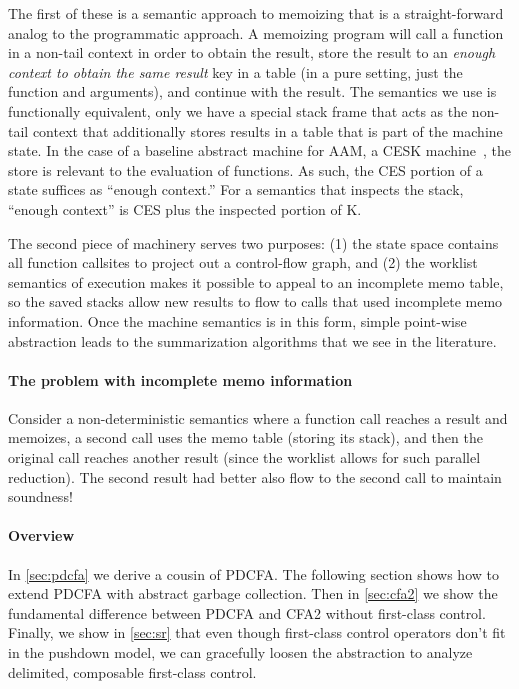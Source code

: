 The first of these is a semantic approach to memoizing that is a straight-forward analog to the programmatic approach.
%
A memoizing program will call a function in a non-tail context in order to obtain the result, store the result to an \emph{enough context to obtain the same result} key in a table (in a pure setting, just the function and arguments), and continue with the result.
%
The semantics we use is functionally equivalent, only we have a special stack frame that acts as the non-tail context that additionally stores results in a table that is part of the machine state.
%
In the case of a baseline abstract machine for AAM, a CESK machine~\citep{dvanhorn:Felleisen1987Calculus}, the store is relevant to the evaluation of functions.
%
As such, the CES portion of a state suffices as ``enough context.''
%
For a semantics that inspects the stack, ``enough context'' is CES plus the inspected portion of K.

The second piece of machinery serves two purposes:
%
(1) the state space contains all function callsites to project out a control-flow graph, and %
(2) the worklist semantics of execution makes it possible to appeal to an incomplete memo table, so the saved stacks allow new results to flow to calls that used incomplete memo information.
%
Once the machine semantics is in this form, simple point-wise abstraction leads to the summarization algorithms that we see in the literature.

\paragraph{The problem with incomplete memo information}
Consider a non-deterministic semantics where a function call reaches a result and memoizes, a second call uses the memo table (storing its stack), and then the original call reaches another result (since the worklist allows for such parallel reduction).
%
The second result had better also flow to the second call to maintain soundness!

\paragraph{Overview}
In \autoref{sec:pdcfa} we derive a cousin of PDCFA.
%
The following section shows how to extend PDCFA with abstract garbage collection. %
%
Then in \autoref{sec:cfa2} we show the fundamental difference between PDCFA and CFA2 without first-class control. %
%
%
Finally, we show in \autoref{sec:sr} that even though first-class control operators don't fit in the pushdown model, we can gracefully loosen the abstraction to analyze delimited, composable first-class control.

